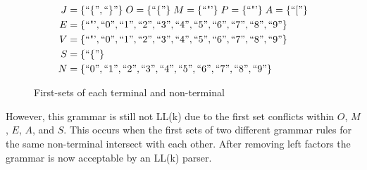 \documentclass[12pt, letterpaper]{article}
\theoremstyle{definition}
\begin{document}
\begin{figure}[H]
    \begin{center}
        \begin{equation}
            \begin{split}
                J &= \{``\{", ``\}"\}\;
                O = \{ ``\{" \}\;
                M = \{ \text{``"'} \}\;
                P = \{ \text{``"'} \}\;
                A = \{ ``[" \}\\
                E &= \{ \text{``"'}, ``0", ``1", ``2", ``3", ``4", ``5", ``6", ``7", ``8", ``9" \}\\
                V &= \{ \text{``"'}, ``0", ``1", ``2", ``3", ``4", ``5", ``6", ``7", ``8", ``9" \}\\
                S &= \{ ``\{" \}\\
                N &= \{``0", ``1", ``2", ``3", ``4", ``5", ``6", ``7", ``8", ``9" \}
            \end{split}
            \nonumber
        \end{equation}
    \end{center}
    \caption{First-sets of each terminal and non-terminal}
\end{figure}

However, this grammar is still not LL(k) due to the first set conflicts within $O$, $M$, $E$, $A$, and $S$. This occurs when the first sets of two different grammar rules for the same non-terminal intersect with each other. After removing left factors the grammar is now acceptable by an LL(k) parser.
\end{document}
